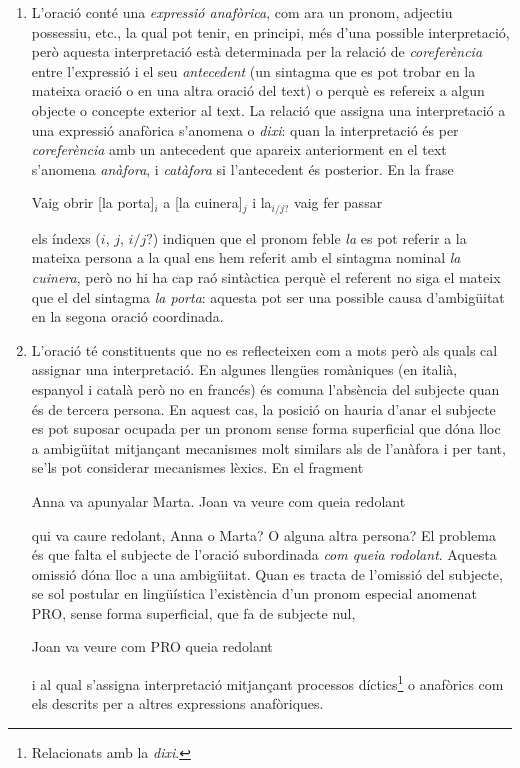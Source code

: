 \begin{enumerate}
\item L'oració conté una \emph{expressió anafòrica}, com ara un
  pronom, adjectiu possessiu, etc., la qual pot tenir, en principi,
  més d'una possible interpretació, però aquesta interpretació està
  determinada per la relació de \emph{coreferència} entre l'expressió
  i el seu \emph{antecedent} (un sintagma que es pot trobar en la
  mateixa oració o en una altra oració del text) o perquè es refereix
  a algun objecte o concepte exterior al text. La relació que assigna
  una interpretació a una expressió anafòrica s'anomena o
  \emph{dixi}: quan la interpretació és per \emph{coreferència} amb un
  antecedent que apareix anteriorment en el text s'anomena
  \emph{anàfora}\label{pg:anafora}, i \emph{catàfora} si l'antecedent
  és posterior.  En la frase
\begin{exemple}
  Vaig obrir [la porta]$_i$ a [la cuinera]$_j$ i la$_{i/j?}$ vaig fer
  passar
\end{exemple}
els índexs ($i$, $j$, $i/j?$) indiquen que el pronom feble \emph{la}
es pot referir a la mateixa persona a la qual ens hem referit amb el
sintagma nominal \emph{la cuinera}, però no hi ha cap raó sintàctica
perquè el referent no siga el mateix que el del sintagma \emph{la
  porta}: aquesta pot ser una possible causa d'ambigüitat en la segona
oració coordinada.

\item L'oració té constituents que no es reflecteixen com a mots però
  als quals cal assignar una interpretació. En algunes llengües
  romàniques (en italià, espanyol i català però no en francés) és
  comuna l'absència del subjecte quan és de tercera persona. En aquest
  cas, la posició on hauria d'anar el subjecte es pot suposar ocupada
  per un pronom sense forma superficial que dóna lloc a ambigüitat
  mitjançant mecanismes molt similars als de l'anàfora i per tant,
  se'ls pot considerar mecanismes lèxics.  En el fragment
  \begin{exemple}
    Anna va apunyalar Marta. Joan va veure com queia redolant
  \end{exemple}
  qui va caure redolant, Anna o Marta?  O alguna altra persona?  El
  problema és que falta el subjecte de l'oració subordinada \emph{com
    queia rodolant}. Aquesta omissió dóna lloc a una ambigüitat. Quan
  es tracta de l'omissió del subjecte, se sol postular en lingüística
  l'existència d'un pronom especial anomenat PRO, sense forma
  superficial, que fa de subjecte nul,
  \begin{exemple}
    Joan va veure com PRO queia redolant
  \end{exemple}
  i al qual s'assigna interpretació mitjançant processos
  díctics\footnote{Relacionats amb la
     \emph{dixi}.} o anafòrics com els descrits per a
  altres expressions anafòriques.
  

\end{enumerate}
